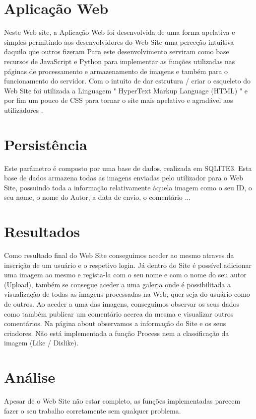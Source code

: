 \documentclass{report}
\begin{document}
\chapter{Aplicação Web}
\label{chap.Aplicação}
Neste Web site, a Aplicação Web foi desenvolvida de uma forma apelativa e simples permitindo aos desenvolvidores do Web Site uma perceção intuitiva daquilo que outros fizeram
Para este desenvolvimento serviram como base recursos de JavaScript e Python para implementar as funções utilizadas nas páginas de processamento e armazenamento de imagens e também para o funcionamento do servidor.
Com o intuito de dar estrutura / criar o esqueleto do Web Site foi utilizada a Linguagem " HyperText Markup Language (HTML) " e por fim um pouco de CSS para tornar o site mais apelativo e agradável aos utilizadores .


\chapter{Persistência}
\label{chap.Persistência}
Este parâmetro é composto por uma base de dados, realizada em SQLITE3. 
Esta base de dados armazena todas as imagens enviadas pelo utilizador para o Web Site, possuindo toda a informação relativamente àquela imagem como o seu ID, o seu nome, o nome do Autor, a data de envio, o comentário ...


\chapter{Resultados}
\label{chap.resultados}
Como resultado final do Web Site conseguimos aceder ao mesmo atraves da inscrição de um usuário e o respetivo login. Já dentro do Site é possível adicionar uma imagem ao mesmo e regista-la com o seu nome e com o nome do seu autor (Upload), também se consegue aceder a uma galeria onde é possibilitada a visualização de todas as imagens processadas na Web, quer seja do usuário como de outros. Ao aceder a uma das imagens, conseguimos observar os seus dados como também publicar um comentário acerca da mesma e visualizar outros comentários. Na página about observamos a informação do Site e os seus criadores. 
Não está implementada a função Process nem a classificação da imagem (Like / Dislike).

\chapter{Análise}
\label{chap.analise}
Apesar de o Web Site não estar completo, as funções implementadas parecem fazer o seu trabalho corretamente sem qualquer problema.
\end{document}
